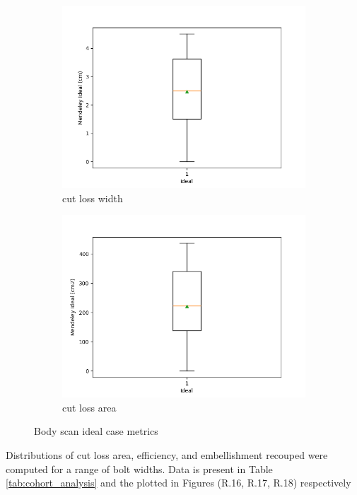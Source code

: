 \begin{figure}[H]
\begin{subfigure}[b]{0.45\textwidth}
        \centering
        \includegraphics[width=\textwidth]{Images/Mendeley_cut_loss_width_ideal_Boxplot.png}
        \caption{cut loss width}
        \label{fig:body_scan_cut_loss_width}
    \end{subfigure}
    \hfill
    \begin{subfigure}[b]{0.45\textwidth}
        \centering
        \includegraphics[width=\textwidth]{Images/Mendeley_cut_loss_area_ideal_Boxplot.png}
        \caption{cut loss area}
        \label{fig:body_scan_cut_loss_area}
    \end{subfigure}
    \vfill
    \caption{Body scan ideal case metrics}
\end{figure}
Distributions of cut loss area, efficiency, and embellishment recouped were computed for a range of bolt widths. Data is present in Table \ref{tab:cohort_analysis} and the plotted in Figures (R.16, R.17, R.18) respectively

